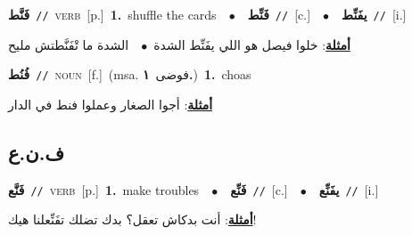 \documentclass[10pt,a4paper,twoside]{article} %
\begin{document}
\begin{multicols}{2}
{\setlength\topsep{0pt}\textbf{\foreignlanguage{arabic}{فَنَّط}}\ {\color{gray}\texttt{//}\color{black}}\ \textsc{verb}\ [p.]\ \textbf{1.}~shuffle the cards\ \ $\bullet$\ \ \setlength\topsep{0pt}\textbf{\foreignlanguage{arabic}{فَنِّط}}\ {\color{gray}\texttt{//}\color{black}}\ [c.]\ \ $\bullet$\ \ \setlength\topsep{0pt}\textbf{\foreignlanguage{arabic}{يفَنِّط}}\ {\color{gray}\texttt{//}\color{black}}\ [i.]\  \begin{flushright}\color{gray}\foreignlanguage{arabic}{\textbf{\underline{\foreignlanguage{arabic}{أمثلة}}}: خلوا فيصل هو اللي يفَنِّط الشدة\ $\bullet$\ \  الشدة ما تْفَنَّطتش مليح}\end{flushright}\color{black}} \vspace{2mm}

{\setlength\topsep{0pt}\textbf{\foreignlanguage{arabic}{فُنُط}}\ {\color{gray}\texttt{//}\color{black}}\ \textsc{noun}\ [f.]\ \color{gray}(msa. \foreignlanguage{arabic}{فوضى}~\foreignlanguage{arabic}{\textbf{١.}})\color{black}\ \textbf{1.}~choas\  \begin{flushright}\color{gray}\foreignlanguage{arabic}{\textbf{\underline{\foreignlanguage{arabic}{أمثلة}}}: أجوا الصغار وعملوا فنط في الدار}\end{flushright}\color{black}} \vspace{2mm}

\vspace{-3mm}
\subsection*{\color{blue}\foreignlanguage{arabic}{ف.ن.ع}\color{blue}{}} 

{\setlength\topsep{0pt}\textbf{\foreignlanguage{arabic}{فَنَّع}}\ {\color{gray}\texttt{//}\color{black}}\ \textsc{verb}\ [p.]\ \textbf{1.}~make troubles\ \ $\bullet$\ \ \setlength\topsep{0pt}\textbf{\foreignlanguage{arabic}{فَنِّع}}\ {\color{gray}\texttt{//}\color{black}}\ [c.]\ \ $\bullet$\ \ \setlength\topsep{0pt}\textbf{\foreignlanguage{arabic}{يفَنِّع}}\ {\color{gray}\texttt{//}\color{black}}\ [i.]\  \begin{flushright}\color{gray}\foreignlanguage{arabic}{\textbf{\underline{\foreignlanguage{arabic}{أمثلة}}}: أنت بدكاش تعقل؟ بدك تضلك تفَنِّعلنا هيك!}\end{flushright}\color{black}} \vspace{2mm}


\end{multicols}
\end{document}
